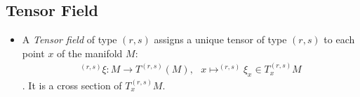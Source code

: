 \documentclass[11pt]{article}
\numberwithin{equation}{section}
\newcommand{\I}[1]{\emph{#1}}
\begin{document}
\subsection{Tensor Field} %
\label{sub:tensor_field}
\begin{itemize}
  \item A \I{Tensor field} of type $(r,s)$ assigns a unique tensor of type $(r,s)$ to each point $x$ of the manifold $M$:
  \begin{align*}
    ^{(r,s)}\xi:M \rightarrow T^{(r,s)}(M),~~~x \mapsto ^{(r,s)}\xi_x \in T^{(r,s)}_xM
  \end{align*}
.   It is a cross section of $T^{(r,s)}_xM$. 
\end{itemize}
\end{document}
